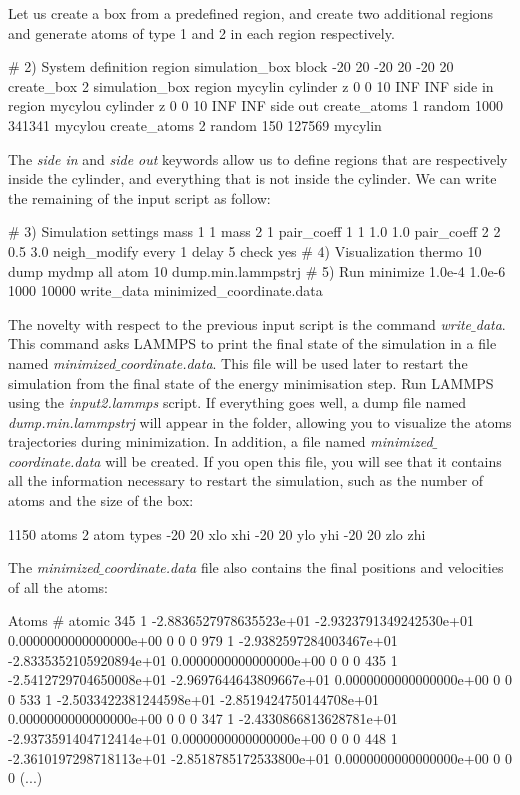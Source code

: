 \noindent Let us create a box from a predefined region,
and create two additional regions and generate
atoms of type 1 and 2 in each region respectively.

\begin{lcverbatim}
# 2) System definition
region simulation_box block -20 20 -20 20 -20 20
create_box 2 simulation_box
region mycylin cylinder z 0 0 10 INF INF side in
region mycylou cylinder z 0 0 10 INF INF side out
create_atoms 1 random 1000 341341 mycylou
create_atoms 2 random 150 127569 mycylin
\end{lcverbatim}

\noindent The \textit{side in} and \textit{side out} keywords
allow us to define regions that are respectively inside the
cylinder, and everything that is not inside the cylinder.
We can write the remaining of the input script as follow:

\begin{lcverbatim}
# 3) Simulation settings
mass 1 1
mass 2 1
pair_coeff 1 1 1.0 1.0
pair_coeff 2 2 0.5 3.0
neigh_modify every 1 delay 5 check yes
# 4) Visualization
thermo 10
dump mydmp all atom 10 dump.min.lammpstrj
# 5) Run
minimize 1.0e-4 1.0e-6 1000 10000
write_data minimized_coordinate.data
\end{lcverbatim}

\noindent The novelty with respect to the previous
input script is the command \textit{write$\_$data}. This command
asks LAMMPS to print the final state of the simulation in
a file named \textit{minimized$\_$coordinate.data}. This file will
be used later to restart the simulation from the final
state of the energy minimisation step.
Run LAMMPS using the \textit{input2.lammps} script. If everything
goes well, a dump file named \textit{dump.min.lammpstrj} will
appear in the folder, allowing you to visualize the atoms
trajectories during minimization. In
addition, a file named \textit{minimized$\_$coordinate.data} will be
created. If you open this file, you will see that it
contains all the information necessary to restart the
simulation, such as the number of atoms and the size of
the box:

\begin{lcverbatim}
1150 atoms
2 atom types
-20 20 xlo xhi
-20 20 ylo yhi
-20 20 zlo zhi
\end{lcverbatim}

\noindent The \textit{minimized$\_$coordinate.data} file also contains the final
positions and velocities of all the atoms:

\begin{lcverbatim}
Atoms # atomic
345 1 -2.8836527978635523e+01 -2.9323791349242530e+01 0.0000000000000000e+00 0 0 0
979 1 -2.9382597284003467e+01 -2.8335352105920894e+01 0.0000000000000000e+00 0 0 0
435 1 -2.5412729704650008e+01 -2.9697644643809667e+01 0.0000000000000000e+00 0 0 0
533 1 -2.5033422381244598e+01 -2.8519424750144708e+01 0.0000000000000000e+00 0 0 0
347 1 -2.4330866813628781e+01 -2.9373591404712414e+01 0.0000000000000000e+00 0 0 0
448 1 -2.3610197298718113e+01 -2.8518785172533800e+01 0.0000000000000000e+00 0 0 0
(...)
\end{lcverbatim}


